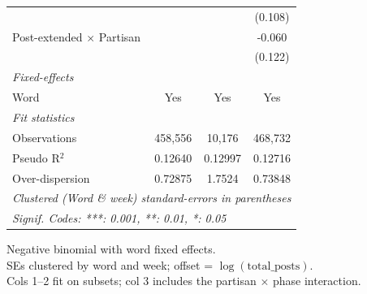 \begin{table}[htbp]
\begin{tabular}{lccc}
                                       &         &               & (0.108)\\   
      Post-extended $\times$ Partisan  &         &               & -0.060\\   
                                       &         &               & (0.122)\\   
      \midrule
      \emph{Fixed-effects}\\
      Word                             & Yes     & Yes           & Yes\\  
      \midrule
      \emph{Fit statistics}\\
      Observations                     & 458,556 & 10,176        & 468,732\\  
      Pseudo R$^2$                     & 0.12640 & 0.12997       & 0.12716\\  
      Over-dispersion                  & 0.72875 & 1.7524        & 0.73848\\  
      \midrule \midrule
      \multicolumn{4}{l}{\emph{Clustered (Word \& week) standard-errors in parentheses}}\\
      \multicolumn{4}{l}{\emph{Signif. Codes: ***: 0.001, **: 0.01, *: 0.05}}\\
   \end{tabular}
   
   \par \raggedright 
   Negative binomial with word fixed effects.\\
   SEs clustered by word and week; offset = $\log(\text{total\_posts})$.\\
   Cols 1--2 fit on subsets; col 3 includes the partisan $\times$ phase interaction.
\end{table}


